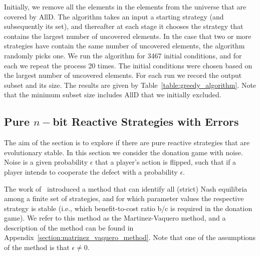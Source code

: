 \documentclass{article}
\theoremstyle{definition}
\begin{document}
Initially, we remove all the elements in the elements from the universe that are
covered by AllD. The algorithm takes an input a starting strategy (and
subsequently its set), and thereafter at each stage it chooses the strategy that
contains the largest number of uncovered elements. In the case that two or more
strategies have contain the same number of uncovered elements, the algorithm
randomly picks one. We run the algorithm for 3467 initial conditions, and for
each we repeat the process 20 times. The initial conditions were chosen based on
the largest number of uncovered elements. For each run we record the output
subset and its size. The results are given by
Table~\ref{table:greedy_algorithm}. Note that the minimum subset size includes
AllD that we initially excluded.

\begin{table}[htbp]
  \centering
\caption{\textbf{Results of greedy algorithm.} The greedy algorithm was used to
find the smallest possible subset of pure memory-two strategies that can
constrain the space of nash in the case of memory-two strategies. Based on the
approximate solution, the smallest subset is of size
11.}\label{table:greedy_algorithm}
\end{table}

\subsection{Pure \(n-\)bit Reactive Strategies with Errors}\label{section:pure_strategies}

The aim of the section is to explore if there are pure reactive strategies that
are evolutionary stable. In this section we consider the donation game with
noise. Noise is a given probability \(\epsilon\) that a player's action is
flipped, such that if a player intends to cooperate the defect with a
probability \(\epsilon\).

The work of~\citep{hilbe:PNAS:2017} introduced a method that can identify all
(strict) Nash equilibria among a finite set of strategies, and for which
parameter values the respective strategy is stable (i.e., which benefit-to-cost
ratio b/c is required in the donation game). We refer to this method as the
Martinez-Vaquero method, and a description of the method can be found in
Appendix~\ref{section:matrinez_vaquero_method}. Note that one of the assumptions
of the method is that \(\epsilon \neq 0\).
\end{document}
